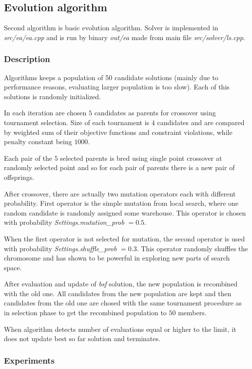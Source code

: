 \documentclass[./main.tex]{subfiles}
\begin{document}
\subsection{Evolution algorithm}
Second algorithm is basic evolution algorithm.
Solver is implemented in \textit{src/ea/ea.cpp} and is run by binary \textit{out/ea} made from main file \textit{src/solver/ls.cpp}.

\subsubsection{Description}

Algorithms keeps a population of 50 candidate solutions (mainly due to performance reasons, evaluating larger population is too slow).
Each of this solutions is randomly initialized.

In each iteration are chosen $5$ candidates as parents for crossover using tournament selection.
Size of each tournament is $4$ candidates and are compared by weighted sum of their objective functions and constraint violations, while penalty constant being $1000$.

Each pair of the $5$ selected parents is bred using single point crossover at randomly selected point and so for each pair of parents there is a new pair of offsprings.

After crossover, there are actually two mutation operators each with different probability.
First operator is the simple mutation from local search, where one random candidate is randomly assigned some warehouse.
This operator is chosen with probability \textit{Settings.mutation\_prob} $ = 0.5$.

When the first operator is not selected for mutation, the second operator is used with probability \textit{Settings.shuffle\_prob} $ = 0.3$.
This operator randomly shuffles the chromosome and has shown to be powerful in exploring new parts of search space.

After evaluation and update of \textit{bsf} solution, the new population is recombined with the old one.
All candidates from the new population are kept and then candidates from the old one are chosed with the same tournament procedure as in selection phase to get the recombined population to $50$ members.

When algorithm detects number of evaluations equal or higher to the limit, it does not update best so far solution and terminates.

\subsubsection{Experiments}
\end{document}
